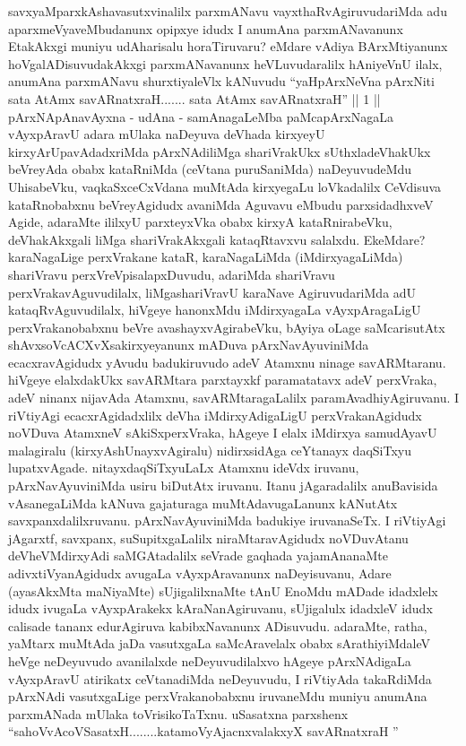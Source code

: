 \begin{artha}
savxyaMparxkAshavasutxvinalilx parxmANavu vayxthaRvAgiruvudariMda adu aparxmeVyaveMbudanunx opipxye idudx I anumAna parxmANavanunx EtakAkxgi muniyu udAharisalu horaTiruvaru? eMdare \mdash  vAdiya BArxMtiyanunx hoVgalADisuvudakAkxgi parxmANavanunx heVLuvudaralilx hAniyeVnU ilalx, anumAna parxmANavu shurxtiyaleVlx kANuvudu \mdash  ``yaHpArxNeVna pArxNiti sata AtAmx savARnatxraH....... sata AtAmx savARnatxraH'' || 1 || pArxNApAnavAyxna - udAna - samAnagaLeMba paMcapArxNagaLa vAyxpAravU adara mUlaka naDeyuva deVhada kirxyeyU kirxyArUpavAdadxriMda pArxNAdiliMga shariVrakUkx sUthxladeVhakUkx beVreyAda obabx kataRniMda (ceVtana puruSaniMda) naDeyuvudeMdu UhisabeVku, vaqkaSxceCxVdana muMtAda kirxyegaLu loVkadalilx CeVdisuva kataRnobabxnu beVreyAgidudx avaniMda Aguvavu eMbudu parxsidadhxveV Agide, adaraMte ililxyU parxteyxVka obabx kirxyA kataRnirabeVku, deVhakAkxgali liMga shariVrakAkxgali kataqRtavxvu salalxdu. EkeMdare? karaNagaLige perxVrakane kataR, karaNagaLiMda (iMdirxyagaLiMda) shariVravu perxVreVpisalapxDuvudu, adariMda shariVravu perxVrakavAguvudilalx, liMgashariVravU karaNave AgiruvudariMda adU kataqRvAguvudilalx, hiVgeye hanonxMdu iMdirxyagaLa vAyxpAragaLigU perxVrakanobabxnu beVre avashayxvAgirabeVku, bAyiya oLage saMcarisutAtx shAvxsoVcACXvXsakirxyeyanunx mADuva pArxNavAyuviniMda ecacxravAgidudx yAvudu badukiruvudo adeV Atamxnu ninage savARMtaranu. hiVgeye elalxdakUkx savARMtara parxtayxkf paramatatavx adeV perxVraka, adeV ninanx nijavAda Atamxnu, savARMtaragaLalilx paramAvadhiyAgiruvanu. I riVtiyAgi ecacxrAgidadxlilx deVha iMdirxyAdigaLigU perxVrakanAgidudx noVDuva AtamxneV sAkiSxperxVraka, hAgeye I elalx iMdirxya samudAyavU malagiralu (kirxyAshUnayxvAgiralu) nidirxsidAga ceYtanayx daqSiTxyu lupatxvAgade. nitayxdaqSiTxyuLaLx Atamxnu ideVdx iruvanu, pArxNavAyuviniMda usiru biDutAtx iruvanu. Itanu jAgaradalilx anuBavisida vAsanegaLiMda kANuva gajaturaga muMtAdavugaLanunx kANutAtx savxpanxdalilxruvanu. pArxNavAyuviniMda badukiye iruvanaSeTx. I riVtiyAgi jAgarxtf, savxpanx, suSupitxgaLalilx niraMtaravAgidudx noVDuvAtanu deVheVMdirxyAdi saMGAtadalilx seVrade gaqhada yajamAnanaMte adivxtiVyanAgidudx avugaLa vAyxpAravanunx naDeyisuvanu, Adare (ayasAkxMta maNiyaMte) sUjigalilxnaMte tAnU EnoMdu mADade idadxlelx idudx ivugaLa vAyxpArakekx kAraNanAgiruvanu, sUjigalulx idadxleV idudx calisade tananx edurAgiruva kabibxNavanunx ADisuvudu. adaraMte, ratha, yaMtarx muMtAda jaDa vasutxgaLa saMcAravelalx obabx sArathiyiMdaleV heVge neDeyuvudo avanilalxde neDeyuvudilalxvo hAgeye pArxNAdigaLa vAyxpAravU atirikatx ceVtanadiMda neDeyuvudu, I riVtiyAda takaRdiMda pArxNAdi vasutxgaLige perxVrakanobabxnu iruvaneMdu muniyu anumAna parxmANada mUlaka toVrisikoTaTxnu. uSasatxna parxshenx \ndash  ``sahoVvAcoVSasatxH........katamoVyAjacnxvalakxyX savARnatxraH ''
\end{artha}

